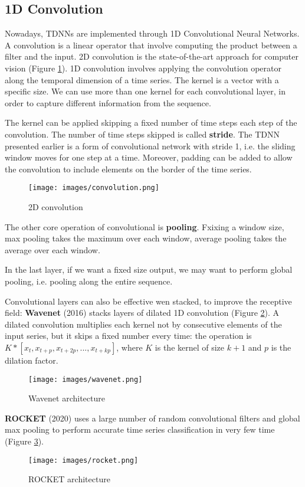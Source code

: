 \documentclass[oneside]{book}
\theoremstyle{definition}
\theoremstyle{plain}
\begin{document}
\subsection{1D Convolution}
Nowadays, TDNNs are implemented through 1D Convolutional Neural Networks. A convolution is a linear operator that involve computing the product between a filter and the input. 2D convolution is the state-of-the-art approach for computer vision (Figure  \ref{fig:2dconv}).
1D convolution involves applying the convolution operator along the temporal dimension of a time series. The kernel is a vector with a specific size. We can use more than one kernel for each convolutional layer, in order to capture different information from the sequence.

The kernel can be applied  skipping a fixed number of time steps each step of the convolution. The number of time steps skipped  is called \textbf{stride}. The TDNN presented earlier is a form of convolutional network with stride 1, i.e. the sliding window moves for one step at a time.
Moreover, padding can be added to allow the convolution to include elements on the border of the time series.

\begin{figure}
    \centering
    \texttt{[image: images/convolution.png]}
    \caption{2D convolution}
    \label{fig:2dconv}
\end{figure}
The other core operation of convolutional is \textbf{pooling}. Fxixing a window size, max pooling takes the maximum over each window, average pooling takes the average over each window.

In the last layer, if we want a fixed size output, we may want to perform global pooling, i.e. pooling along the entire sequence.

Convolutional layers can also be effective wen stacked, to improve the receptive field: \textbf{Wavenet} (2016) stacks layers of dilated 1D convolution (Figure \ref{fig:wavenet}). A dilated convolution multiplies each kernel not by consecutive elements of the input series, but it skips a fixed number every time: the operation is $K*[x_t, x_{t+p}, x_{t+2p},..., x_{t+kp}]$, where $K$ is the kernel of size $k+1$ and $p$ is the dilation factor.
\begin{figure}
    \centering
    \texttt{[image: images/wavenet.png]}
    \caption{Wavenet architecture}
    \label{fig:wavenet}
\end{figure}
\textbf{ROCKET} (2020) uses a large number of random convolutional filters and global max pooling to perform accurate time series classification in very few time (Figure \ref{fig:rocket}).
\begin{figure}
    \centering
    \texttt{[image: images/rocket.png]}
    \caption{ROCKET architecture}
    \label{fig:rocket}
\end{figure}
\end{document}
